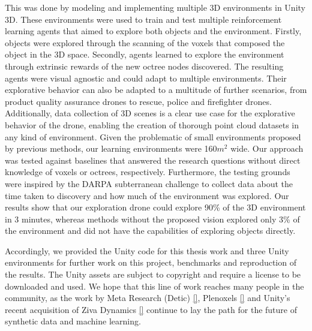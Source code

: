 This was done by modeling and implementing multiple 3D environments in Unity 3D. These environments were used to train and test multiple reinforcement learning agents that aimed to explore both objects and the environment. Firstly, objects were explored through the scanning of the voxels that composed the object in the 3D space. Secondly, agents learned to explore the environment through extrinsic rewards of the new octree nodes discovered. The resulting agents were visual agnostic and could adapt to multiple environments. Their explorative behavior can also be adapted to a multitude of further scenarios, from product quality assurance drones to rescue, police and firefighter drones. Additionally, data collection of 3D scenes is a clear use case for the explorative behavior of the drone, enabling the creation of thorough point cloud datasets in any kind of environment. Given the problematic of small environments proposed by previous methods, our learning environments were 160$m^2$ wide. Our approach was tested against baselines that answered the research questions without direct knowledge of voxels or octrees, respectively. Furthermore, the testing grounds were inspired by the DARPA subterranean challenge to collect data about the time taken to discovery and how much of the environment was explored. Our results show that our exploration drone could explore 90\% of the 3D environment in 3 minutes, whereas methods without the proposed vision explored only 3\% of the environment and did not have the capabilities of exploring objects directly. 

Accordingly, we provided the Unity code for this thesis work and three Unity environments for further work on this project, benchmarks and reproduction of the results. The Unity assets are subject to copyright and require a license to be downloaded and used. We hope that this line of work reaches many people in the community, as the work by Meta Research (Detic) \ref{}, Plenoxels \ref{} and Unity's recent acquisition of Ziva Dynamics \ref{} continue to lay the path for the future of synthetic data and machine learning.


